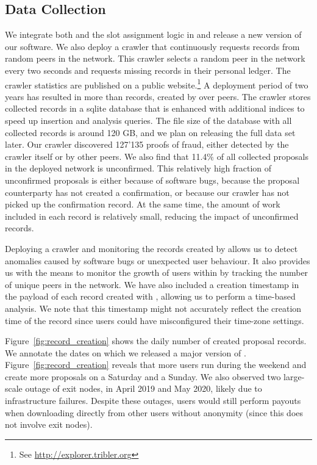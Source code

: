 \subsection{Data Collection}
We integrate both \TrustChain{} and the slot assignment logic in \Tribler{} and release a new version of our software.
We also deploy a crawler that continuously requests \TrustChain{} records from random peers in the \Tribler{} network.
This crawler selects a random peer in the \TrustChain{} network every two seconds and requests missing records in their personal ledger.
The crawler statistics are published on a public website.\footnote{See \url{http://explorer.tribler.org}}
A deployment period of two years has resulted in more than \TrialRecords{} records, created by over \TrialUsers{} peers.
The crawler stores collected records in a sqlite database that is enhanced with additional indices to speed up insertion and analysis queries.
The file size of the database with all collected records is around 120 GB, and we plan on releasing the full data set later.
Our crawler discovered 127'135 proofs of fraud, either detected by the crawler itself or by other peers.
We also find that 11.4\% of all collected proposals in the deployed \TrustChain{} network is unconfirmed.
This relatively high fraction of unconfirmed proposals is either because of software bugs, because the proposal counterparty has not created a confirmation, or because our crawler has not picked up the confirmation record.
At the same time, the amount of work included in each record is relatively small, reducing the impact of unconfirmed records.

Deploying a crawler and monitoring the records created by \TrustChain{} allows us to detect anomalies caused by software bugs or unexpected user behaviour.
It also provides us with the means to monitor the growth of users within \Tribler{} by tracking the number of unique peers in the \TrustChain{} network.
We have also included a creation timestamp in the payload of each record created with \Tribler{}, allowing us to perform a time-based analysis.
We note that this timestamp might not accurately reflect the creation time of the record since users could have misconfigured their time-zone settings.

Figure~\ref{fig:record_creation} shows the daily number of created proposal records.
We annotate the dates on which we released a major version of \Tribler{}.
Figure~\ref{fig:record_creation} reveals that more users run \Tribler{} during the weekend and create more proposals on a Saturday and a Sunday.
We also observed two large-scale outage of exit nodes, in April 2019 and May 2020, likely due to infrastructure failures.
Despite these outages, users would still perform payouts when downloading directly from other \Tribler{} users without anonymity (since this does not involve exit nodes).

